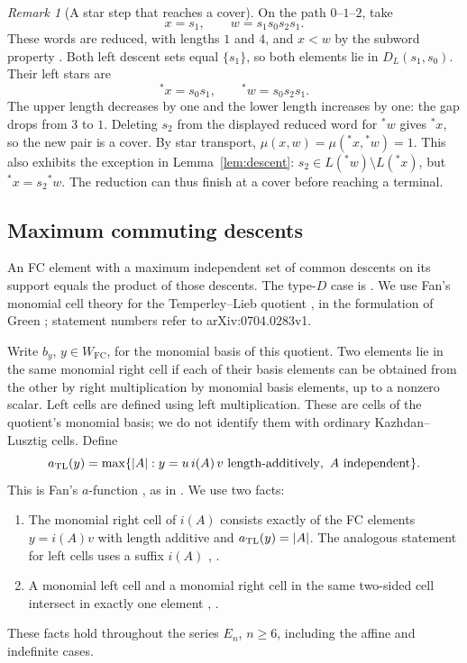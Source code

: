 \documentclass[10pt]{article}
\theoremstyle{remark}
\newtheorem{remark}[theorem]{Remark}
\newcommand{\FC}{W_{\mathrm{FC}}}
\begin{document}
\begin{remark}[A star step that reaches a cover]\label{rem:star-example}
On the path $0\text{--}1\text{--}2$, take
\[
 x=s_1,\qquad w=s_1s_0s_2s_1.
\]
These words are reduced, with lengths $1$ and $4$, and $x<w$ by the
subword property \cite[Theorem~2.2.2]{BB}. Both left descent sets equal $\{s_1\}$, so both
elements lie in $D_L(s_1,s_0)$. Their left stars are
\[
 {}^*x=s_0s_1,\qquad {}^*w=s_0s_2s_1.
\]
The upper length decreases by one and the lower length increases by one:
the gap drops from $3$ to $1$. Deleting $s_2$ from the displayed reduced
word for ${}^*w$ gives ${}^*x$, so the new pair is a cover. By star transport,
$\mu(x,w)=\mu({}^*x,{}^*w)=1$.
This also exhibits the exception in Lemma~\ref{lem:descent}:
$s_2\in L({}^*w)\setminus L({}^*x)$, but ${}^*x=s_2{}^*w$.
The reduction can thus finish at a cover before reaching a terminal.
\end{remark}

\subsection{Maximum commuting descents}
An FC element with a maximum independent set of common descents on its
support equals the product of those descents. The type-$D$ case is
\cite[Lemma~4.5.8]{Gern}. We use Fan's monomial cell theory for the
Temperley--Lieb quotient \cite{Fan}, in the formulation of
Green \cite[\S4]{GreenEn}; statement numbers refer to arXiv:0704.0283v1.

Write $b_y$, $y\in\FC$, for the monomial basis of this quotient.
Two elements lie in the same monomial right cell if each of their basis
elements can be obtained from the other by right multiplication by
monomial basis elements, up to a nonzero scalar. Left cells are defined
using left multiplication. These are cells of the quotient's monomial
basis; we do not identify them with ordinary Kazhdan--Lusztig cells.
Define
\[
 a_{\rm TL}(y)=\max\{|A|:y=u\,i(A)\,v\text{ length-additively},
                         \ A\text{ independent}\}.
\]
This is Fan's $a$-function \cite[Definition~2.3.1, p.~141]{Fan}, as in
\cite[Definition~4.1]{GreenEn}. We use two facts:
\begin{enumerate}
\item The monomial right cell of $i(A)$ consists exactly of the FC
elements $y=i(A)v$ with length additive and $a_{\rm TL}(y)=|A|$.
The analogous statement for left cells uses a suffix $i(A)$
\cite[Proposition~4.4(iv)]{GreenEn},
\cite[Proposition~4.4.3 and its dual, p.~148]{Fan}.
\item A monomial left cell and a monomial right cell in the same
two-sided cell intersect in exactly one element
\cite[Proposition~4.4(v)]{GreenEn},
\cite[p.~140 and proof of Theorem~6.1.2, p.~154]{Fan}.
\end{enumerate}
These facts hold throughout the series $E_n$, $n\geq6$, including the
affine and indefinite cases.
\end{document}
